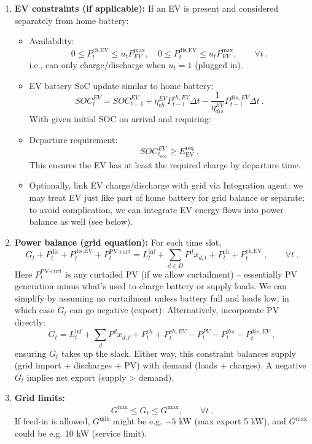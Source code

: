 \documentclass[12pt,a4paper]{article}
\begin{document}
\begin{enumerate}[label=(\arabic*)]
    \item \textbf{EV constraints (if applicable):} If an EV is present and considered separately from home battery:
        \begin{itemize}
            \item Availability: 
            \[
            0 \le P^{\text{ch,EV}}_t \le u_t P^{\max}_{EV}, \quad
            0 \le P^{\text{dis,EV}}_t \le u_t P^{\max}_{EV}, \qquad \forall t~.
            \]
            i.e., can only charge/discharge when $u_t=1$ (plugged in).
            \item EV battery SoC update similar to home battery:
            \[
            SOC^{EV}_{t} = SOC^{EV}_{t-1} + \eta_{ch}^{EV} P^{ch,EV}_{t-1}\Delta t - \frac{1}{\eta_{dis}^{EV}} P^{dis,EV}_{t-1}\Delta t~.
            \]
            With given initial SOC on arrival and requiring:
            \item Departure requirement:
            \[
            SOC^{EV}_{t_{\text{dep}}} \ge E^{\text{req}}_{\text{EV}}~.
            \]
            This ensures the EV has at least the required charge by departure time.
            \item Optionally, link EV charge/discharge with grid via Integration agent: we may treat EV just like part of home battery for grid balance or separate; to avoid complication, we can integrate EV energy flows into power balance as well (see below).
        \end{itemize}
    \item \textbf{Power balance (grid equation):} For each time slot,
    \[
    G_t + P^{\text{dis}}_t + P^{\text{dis,EV}}_t + P^{\text{PV-curt}}_t = L^{\text{inf}}_t + \sum_{d \in D} P^d x_{d,t} + P^{\text{ch}}_t + P^{\text{ch,EV}}_t~, \qquad \forall t~.
    \]
    Here $P^{\text{PV-curt}}_t$ is any curtailed PV (if we allow curtailment) – essentially PV generation minus what’s used to charge battery or supply loads. We can simplify by assuming no curtailment unless battery full and loads low, in which case $G_t$ can go negative (export):
    Alternatively, incorporate PV directly:
    \[
    G_t = L^{\text{inf}}_t + \sum_{d} P^d x_{d,t} + P^{ch}_t + P^{ch,EV}_t - P^{PV}_t - P^{dis}_t - P^{dis,EV}_t~,
    \] 
    ensuring $G_t$ takes up the slack. Either way, this constraint balances supply (grid import + discharges + PV) with demand (loads + charges). A negative $G_t$ implies net export (supply > demand).
    \item \textbf{Grid limits:} 
    \[
    G^{\min} \le G_t \le G^{\max}, \qquad \forall t~.
    \]
    If feed-in is allowed, $G^{\min}$ might be e.g. $-5$ kW (max export 5 kW), and $G^{\max}$ could be e.g. $10$ kW (service limit).
\end{enumerate}
\end{document}
